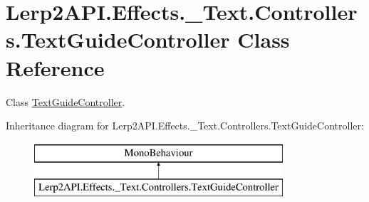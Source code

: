 \hypertarget{class_lerp2_a_p_i_1_1_effects_1_1___text_1_1_controllers_1_1_text_guide_controller}{}\section{Lerp2\+A\+P\+I.\+Effects.\+\_\+\+Text.\+Controllers.\+Text\+Guide\+Controller Class Reference}
\label{class_lerp2_a_p_i_1_1_effects_1_1___text_1_1_controllers_1_1_text_guide_controller}


Class \hyperlink{class_lerp2_a_p_i_1_1_effects_1_1___text_1_1_controllers_1_1_text_guide_controller}{Text\+Guide\+Controller}.  


Inheritance diagram for Lerp2\+A\+P\+I.\+Effects.\+\_\+\+Text.\+Controllers.\+Text\+Guide\+Controller\+:\begin{figure}[H]
\begin{center}
\leavevmode
\includegraphics[height=2.000000cm]{class_lerp2_a_p_i_1_1_effects_1_1___text_1_1_controllers_1_1_text_guide_controller}
\end{center}
\end{figure}
